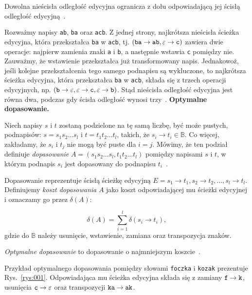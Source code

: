 \documentclass{praca1}
\begin{document}
\begin{lemma}
Dowolna nieścisła odległość edycyjna ogranicza z dołu odpowiadającą jej ścisłą odległość edycyjną~\cite{Boytsov2011:indexingmethods}.
\end{lemma}

Rozważmy napisy \verb|ab|, \verb|ba| oraz \verb|acb|. Z jednej strony, najkrótsza nieścisła ścieżka edycyjna, która przekształca \verb|ba| w \verb|acb|, tj. $(\verb|ba| \rightarrow \verb|ab|, \varepsilon \rightarrow \verb|c|)$ zawiera dwie operacje: najpierw zamienia znaki \verb|a| i \verb|b|, a następnie wstawia \verb|c| pomiędzy nie. Zauważmy, że wstawienie przekształca już transformowany napis. Jednakowoż, jeśli kolejne przekształcenia tego samego podnapisu są wykluczone, to najkrótsza ścieżka edycyjna, która przekształca \verb|ba| w \verb|acb|, składa się z trzech operacji edycyjnych, np. $(\verb|b| \rightarrow \varepsilon, \varepsilon \rightarrow \verb|c|, \varepsilon \rightarrow \verb|b|)$. Stąd nieścisła odległość edycyjna jest równa dwa, podczas gdy ścisła odległość wynosi trzy~\cite{Boytsov2011:indexingmethods}. 
\textbf{Optymalne dopasowanie.} 
\begin{definition}
Niech napisy $s$ i $t$ zostaną podzielone na tę samą liczbę, być może pustych, podnapisów: $s = s_1 s_2 \ldots s_l$ i $t = t_1 t_2 \ldots t_l$, takich, że $s_i \rightarrow t_i \in \mathbb{B}$. Co więcej, zakładamy, że $s_i$ i $t_j$ nie mogą być puste dla $i = j$. Mówimy, że ten podział definiuje \emph{dopasowanie} $A = (s_1 s_2\ldots s_l, t_1 t_2 \ldots t_l)$ pomiędzy napisami $s$ i $t$, w którym podnapis $s_i$ jest dopasowany do podnapisu $t_i$~\cite{Boytsov2011:indexingmethods}.
\end{definition}

Dopasowanie reprezentuje ścisłą ścieżkę edycyjną $E = s_1 \rightarrow t_1, s_2 \rightarrow t_2, \ldots, s_l \rightarrow t_l$. Definiujemy \emph{koszt dopasowania} $A$ jako koszt odpowiadającej mu ścieżki edycyjnej i oznaczamy go przez $\delta(A)$:

\begin{equation}
\label{eq:003}
\delta(A) = \sum\limits_{i = 1}^{l} \delta(s_i \rightarrow t_i),
\end{equation}
gdzie do $\mathbb{B}$ należy usunięcie, wstawienie, zamiana oraz transpozycja znaków.

\emph{Optymalne dopasowanie} to dopasowanie o najmniejszym koszcie~\cite{Boytsov2011:indexingmethods}.


\begin{example}
Przykład optymalnego dopasowania pomiędzy słowami \verb|foczka| i \verb|kozak| prezentuje Rys.~\ref{rys:001}. Odpowiadająca mu ścieżka edycyjna składa się z zamiany $\verb|f| \rightarrow \verb|k|$, usunięcia $\verb|c| \rightarrow \varepsilon$ oraz transpozycji $\verb|ka| \rightarrow \verb|ak|$.
\end{example}
\end{document}
